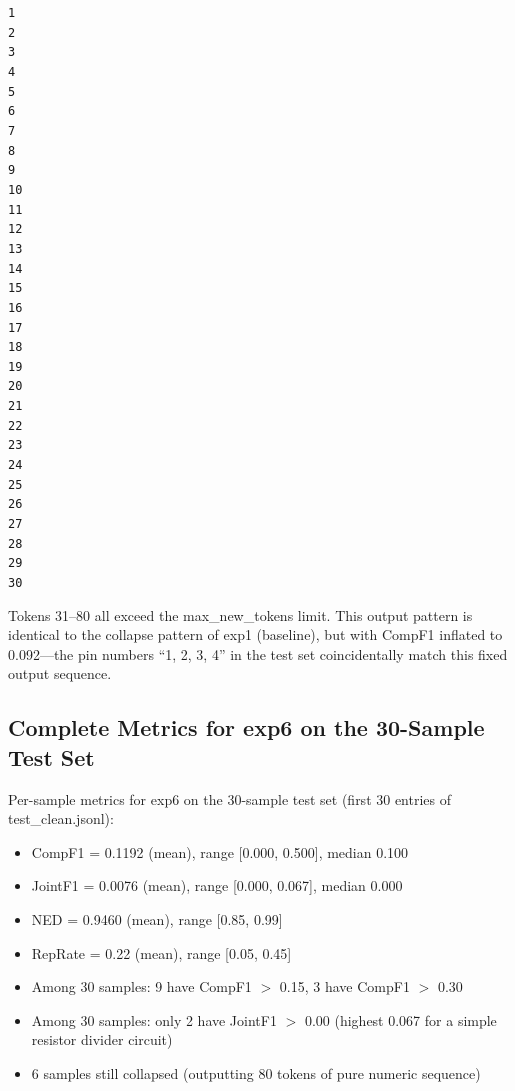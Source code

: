\texttt{1\\2\\3\\4\\5\\6\\7\\8\\9\\10\\11\\12\\13\\14\\15\\16\\17\\18\\19\\20\\21\\22\\23\\24\\25\\26\\27\\28\\29\\30}

Tokens 31--80 all exceed the max\_new\_tokens limit. This output pattern is identical to the collapse pattern of exp1 (baseline), but with CompF1 inflated to 0.092---the pin numbers ``1, 2, 3, 4'' in the test set coincidentally match this fixed output sequence.

\subsection{Complete Metrics for exp6 on the 30-Sample Test Set}

Per-sample metrics for exp6 on the 30-sample test set (first 30 entries of test\_clean.jsonl):

\begin{itemize}[nosep]
    \item CompF1 = 0.1192 (mean), range [0.000, 0.500], median 0.100
    \item JointF1 = 0.0076 (mean), range [0.000, 0.067], median 0.000
    \item NED = 0.9460 (mean), range [0.85, 0.99]
    \item RepRate = 0.22 (mean), range [0.05, 0.45]
    \item Among 30 samples: 9 have CompF1 $>$ 0.15, 3 have CompF1 $>$ 0.30
    \item Among 30 samples: only 2 have JointF1 $>$ 0.00 (highest 0.067 for a simple resistor divider circuit)
    \item 6 samples still collapsed (outputting 80 tokens of pure numeric sequence)
\end{itemize}

